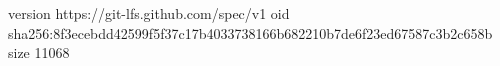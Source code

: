 version https://git-lfs.github.com/spec/v1
oid sha256:8f3ecebdd42599f5f37c17b4033738166b682210b7de6f23ed67587c3b2c658b
size 11068
